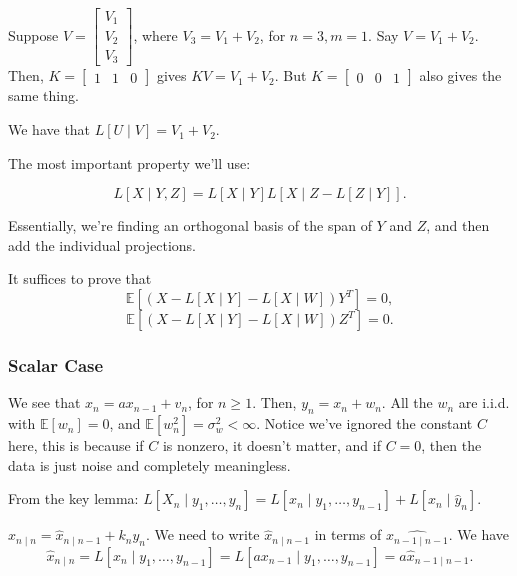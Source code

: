 \documentclass{article}
\newcommand{\EE}{\mathbb{E}}
\begin{document}
\begin{example}
	Suppose $V = \begin{bmatrix} V_1 \\ V_2 \\ V_3 \end{bmatrix}$, where $V_3 = V_1 + V_2$, for $n = 3, m = 1$. Say $V = V_1 + V_2$. Then, $K = \begin{bmatrix} 1 & 1 & 0 \end{bmatrix}$ gives $KV = V_1 + V_2$. But $K = \begin{bmatrix} 0 & 0 & 1 \end{bmatrix}$ also gives the same thing. 

	We have that $L[U \mid V] = V_1 + V_2$.
\end{example}

The most important property we'll use: 
\begin{lemma}
\[L[X \mid Y, Z] = L[X \mid Y] L[X \mid Z - L[Z \mid Y]].\]
\end{lemma}
Essentially, we're finding an orthogonal basis of the span of $Y$ and $Z$, and then add the individual projections.

It suffices to prove that
\[\EE[(X - L[X \mid Y] - L[X \mid W]) Y^T] = 0,\] 
\[\EE[(X - L[X \mid Y] - L[X \mid W]) Z^T] = 0.\]

\subsubsection{Scalar Case} 
We see that $x_n = a x_{n-1} + v_n$, for $n \geq 1$. Then, $y_n = x_n + w_n$. All the $w_n$ are i.i.d. with $\EE[w_n] = 0$, and $\EE[w_n^2] = \sigma_{w}^2 < \infty$. 
Notice we've ignored the constant $C$ here, this is because if $C$ is nonzero, it doesn't matter, and if $C = 0$, then the data is just noise and completely meaningless.

From the key lemma:
$L[X_n \mid y_1, \ldots, y_n] = L[x_n \mid y_1, \ldots, y_{n - 1}] + L[x_n \mid \hat{y}_n]$. 

$\hat{x}_{n \mid n} = \hat{x}_{n \mid n - 1} + k_n y_n$. We need to write $\hat{x}_{n \mid n-1}$ in terms of $\hat{x_{n - 1 \mid n - 1}}$. We have 
\[\hat{x}_{n \mid n} = L[x_n \mid y_1, \ldots, y_{n - 1}] = L[ax_{n - 1} \mid y_1, \ldots, y_{n-1}] = a\hat{x}_{n-1 \mid n-1}.\]
\end{document}
